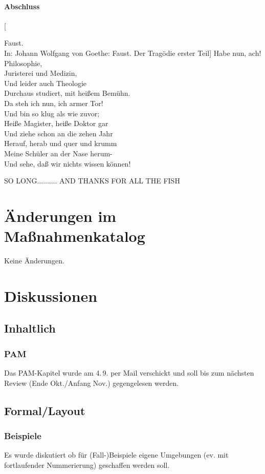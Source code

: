 \documentclass[
ngerman,
paper=a4,
asymmetric,
fontsize=10pt,
draft=false,
numbers=noenddot,
bibtotocnumbered,
footnotes=multiple,
]{scrreprt}
\newcommand{\Dictum}[2][]{
  \bigskip
  \begin{flushright}
  \begin{minipage}{\ThirdNetWidth}\scriptsize
  {\ttfamily\sloppy\color{AltBlueDark}#2}\vspace{\baselineskip}
  
  {\FontSansNarrowFamily\color{AltBlueVeryLight}#1}
  \end{minipage}
  \end{flushright}
  \bigskip\noindent
  }
\begin{document}
\subsubsection{Abschluss}

\Dictum
[Faust. \\
In: Johann Wolfgang von Goethe: Faust. Der Tragödie erster Teil]
{Habe nun, ach! Philosophie,\\
Juristerei und Medizin,\\
Und leider auch Theologie\\
Durchaus studiert, mit heißem Bemühn.\\
Da steh ich nun, ich armer Tor!\\
Und bin so klug als wie zuvor;\\
Heiße Magister, heiße Doktor gar\\
Und ziehe schon an die zehen Jahr\\
Herauf, herab und quer und krumm\\
Meine Schüler an der Nase herum-\\
Und sehe, daß wir nichts wissen können!}

SO LONG.......... AND THANKS FOR ALL THE FISH


\chapter{Änderungen im Maßnahmenkatalog}

Keine Änderungen.

\chapter{Diskussionen}
\section{Inhaltlich}
\subsection{PAM}
Das PAM-Kapitel wurde am 4.\,9. per Mail verschickt und soll bis zum
nächsten Review (Ende Okt./Anfang Nov.) gegengelesen werden.

\section{Formal/Layout}
\subsection{Beispiele}
Es wurde diskutiert ob für (Fall-)Beispiele eigene Umgebungen (ev. mit
fortlaufender Nummerierung) geschaffen werden soll.
\end{document}
